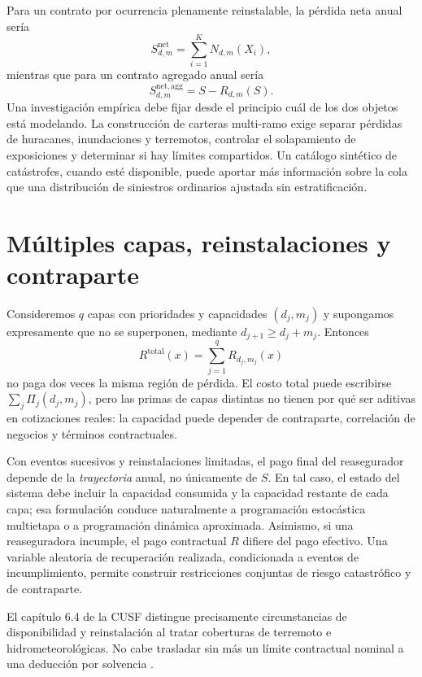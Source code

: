 \documentclass[11pt,reqno]{amsart}
\theoremstyle{definition}\newtheorem{definition}[theorem]{Definición}
\theoremstyle{remark}\newtheorem{remark}[theorem]{Observación}
\begin{document}
Para un contrato por ocurrencia plenamente reinstalable, la pérdida neta anual sería
\begin{equation}
S^{\mathrm{net}}_{d,m}=\sum_{i=1}^K N_{d,m}(X_i),
\end{equation}
mientras que para un contrato agregado anual sería
\begin{equation}
S^{\mathrm{net,agg}}_{d,m}=S-R_{d,m}(S).
\end{equation}
Una investigación empírica debe fijar desde el principio cuál de los dos objetos está modelando. La construcción de carteras multi-ramo exige separar pérdidas de huracanes, inundaciones y terremotos, controlar el solapamiento de exposiciones y determinar si hay límites compartidos. Un catálogo sintético de catástrofes, cuando esté disponible, puede aportar más información sobre la cola que una distribución de siniestros ordinarios ajustada sin estratificación.

\section{Múltiples capas, reinstalaciones y contraparte}
Consideremos $q$ capas con prioridades y capacidades $(d_j,m_j)$ y supongamos expresamente que no se superponen, mediante $d_{j+1}\ge d_j+m_j$. Entonces
\[
R^{\mathrm{total}}(x)=\sum_{j=1}^q R_{d_j,m_j}(x)
\]
no paga dos veces la misma región de pérdida. El costo total puede escribirse $\sum_j\Pi_j(d_j,m_j)$, pero las primas de capas distintas no tienen por qué ser aditivas en cotizaciones reales: la capacidad puede depender de contraparte, correlación de negocios y términos contractuales.

Con eventos sucesivos y reinstalaciones limitadas, el pago final del reasegurador depende de la \emph{trayectoria} anual, no únicamente de $S$. En tal caso, el estado del sistema debe incluir la capacidad consumida y la capacidad restante de cada capa; esa formulación conduce naturalmente a programación estocástica multietapa o a programación dinámica aproximada. Asimismo, si una reaseguradora incumple, el pago contractual $R$ difiere del pago efectivo. Una variable aleatoria de recuperación realizada, condicionada a eventos de incumplimiento, permite construir restricciones conjuntas de riesgo catastrófico y de contraparte.

El capítulo 6.4 de la CUSF distingue precisamente circunstancias de disponibilidad y reinstalación al tratar coberturas de terremoto e hidrometeorológicas. No cabe trasladar sin más un límite contractual nominal a una deducción por solvencia \cite{CUSF64}.
\end{document}
